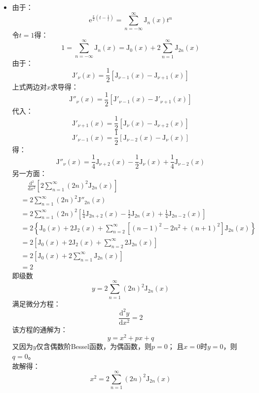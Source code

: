 \documentclass[fontset=windows]{ctexart}
\begin{document}
\begin{itemize}
    \item[2.(3)]
    由于：
    \[
    \mathrm{e}^{\tfrac{x}{2}\left(t-\tfrac{1}{t}\right)} = \sum_{n=-\infty}^{\infty}\mathrm{J}_n(x)t^n
    \]
    令$t=1$得：
    \[
    1 = \sum_{n=-\infty}^{\infty}\mathrm{J}_n(x) = \mathrm{J}_0(x)+2\sum_{n=1}^{\infty}\mathrm{J}_{2n}(x)
    \]
    由于：
    \[
    \mathrm{J}'_\nu(x) = \frac{1}{2}\left[\mathrm{J}_{\nu-1}(x) - \mathrm{J}_{\nu+1}(x)\right]
    \]
    上式两边对$x$求导得：
    \[
    \mathrm{J}''_\nu(x) = \frac{1}{2}\left[\mathrm{J}'_{\nu-1}(x) - \mathrm{J}'_{\nu+1}(x)\right]
    \]
    代入：
    \[
    \mathrm{J}'_{\nu+1}(x) = \frac{1}{2}\left[\mathrm{J}_{\nu}(x) - \mathrm{J}_{\nu+2}(x)\right]
    \]
    \[
    \mathrm{J}'_{\nu-1}(x) = \frac{1}{2}\left[\mathrm{J}_{\nu-2}(x) - \mathrm{J}_{\nu}(x)\right]
    \]
    得：
    \[
    \mathrm{J}''_\nu(x) = \frac{1}{4}\mathrm{J}_{\nu+2}(x) - \frac{1}{2}\mathrm{J}_\nu(x) + \frac{1}{4}\mathrm{J}_{\nu-2}(x)
    \]
    另一方面：
    \begin{align*}
    &\quad \frac{\mathrm{d}^2}{\mathrm{d}x^2}\left[2\sum_{n=1}^{\infty}(2n)^2\mathrm{J}_{2n}(x)\right] \\
    &= 2\sum_{n=1}^{\infty}(2n)^2\mathrm{J}''_{2n}(x) \\
    &= 2\sum_{n=1}^{\infty}(2n)^2\left[\frac{1}{4}\mathrm{J}_{2n+2}(x) - \frac{1}{2}\mathrm{J}_{2n}(x) + \frac{1}{4}\mathrm{J}_{2n-2}(x)\right] \\
    &= 2\left\{\mathrm{J}_0(x) + 2\mathrm{J}_2(x) + \sum_{n=2}^{\infty}\left[(n-1)^2-2n^2+(n+1)^2\right]\mathrm{J}_{2n}(x)\right\} \\
    &= 2\left[\mathrm{J}_0(x) + 2\mathrm{J}_2(x) + \sum_{n=2}^{\infty}2\mathrm{J}_{2n}(x)\right] \\
    &= 2\left[\mathrm{J}_0(x)+2\sum_{n=1}^{\infty}\mathrm{J}_{2n}(x)\right] \\
    &= 2
    \end{align*}
    即级数
    \[
    y = 2\sum_{n=1}^{\infty}(2n)^2\mathrm{J}_{2n}(x)
    \]
    满足微分方程：
    \[
    \frac{\mathrm{d}^2 y}{\mathrm{d}x^2}= 2
    \]
    该方程的通解为：
    \[
    y = x^2 + px + q
    \]
    又因为$y$仅含偶数阶Bessel函数，为偶函数，则$p=0$；
    且$x=0$时$y=0$，则$q=0$。 \\
    故解得：
    \[
    x^2 = 2\sum_{n=1}^{\infty}(2n)^2\mathrm{J}_{2n}(x)
    \]
    \bigskip


\end{itemize}
\end{document}
